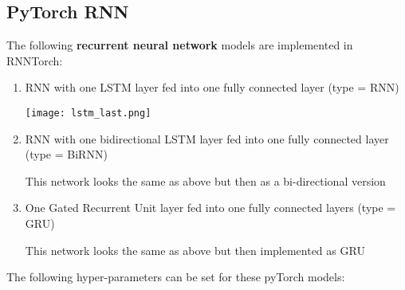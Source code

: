 \documentclass[]{article}
\begin{document}
\subsection{PyTorch RNN}\label{pytorch-rnn}

The following \textbf{recurrent neural network} models are implemented
in RNNTorch:

\begin{enumerate}
\def\labelenumi{\arabic{enumi})}
\item
  RNN with one LSTM layer fed into one fully connected layer (type =
  RNN)

  \texttt{[image: lstm\_last.png]}
\item
  RNN with one bidirectional LSTM layer fed into one fully connected
  layer (type = BiRNN)

  This network looks the same as above but then as a bi-directional
  version
\item
  One Gated Recurrent Unit layer fed into one fully connected layers
  (type = GRU)

  This network looks the same as above but then implemented as GRU
\end{enumerate}

The following hyper-parameters can be set for these pyTorch models:
\end{document}
